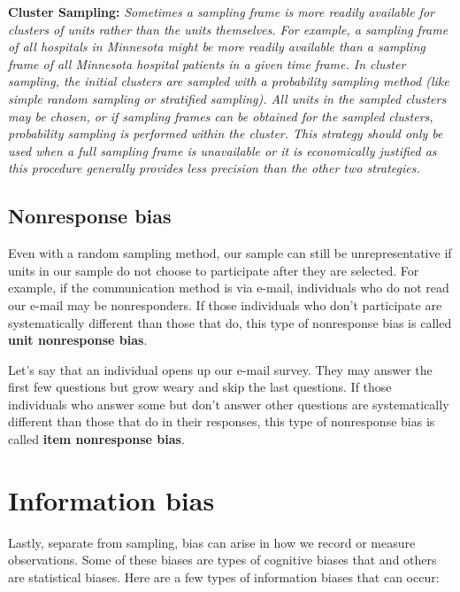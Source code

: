 \documentclass[]{book}
\begin{document}
\textbf{Cluster Sampling:} \emph{Sometimes a sampling frame is more readily available for clusters of units rather than the units themselves. For example, a sampling frame of all hospitals in Minnesota might be more readily available than a sampling frame of all Minnesota hospital patients in a given time frame. In cluster sampling, the initial clusters are sampled with a probability sampling method (like simple random sampling or stratified sampling). All units in the sampled clusters may be chosen, or if sampling frames can be obtained for the sampled clusters, probability sampling is performed within the cluster. This strategy should only be used when a full sampling frame is unavailable or it is economically justified as this procedure generally provides less precision than the other two strategies.}

\hypertarget{nonresponse-bias}{%
\subsection{Nonresponse bias}\label{nonresponse-bias}}

Even with a random sampling method, our sample can still be unrepresentative if units in our sample do not choose to participate after they are selected. For example, if the communication method is via e-mail, individuals who do not read our e-mail may be nonresponders. If those individuals who don't participate are systematically different than those that do, this type of nonresponse bias is called \textbf{unit nonresponse bias}.

Let's say that an individual opens up our e-mail survey. They may answer the first few questions but grow weary and skip the last questions. If those individuals who answer some but don't answer other questions are systematically different than those that do in their responses, this type of nonresponse bias is called \textbf{item nonresponse bias}.

\hypertarget{information-bias}{%
\section{Information bias}\label{information-bias}}

Lastly, separate from sampling, bias can arise in how we record or measure observations. Some of these biases are types of cognitive biases that and others are statistical biases. Here are a few types of information biases that can occur:
\end{document}
